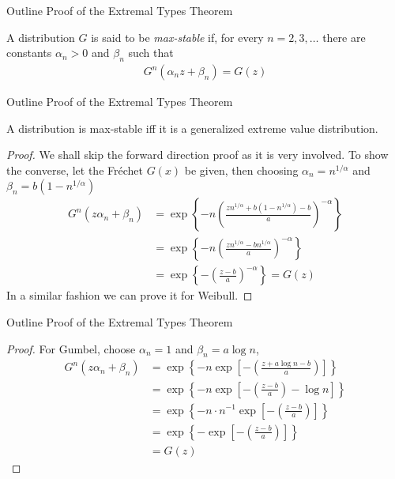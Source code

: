 \documentclass[10pt]{beamer}
\begin{document}
\begin{frame}{Outline Proof of the Extremal Types Theorem}
\begin{definition}
A distribution $G$ is said to be \emph{max-stable} if, for every $n=2,3,\ldots$ there are constants $\alpha_n>0$ and $\beta_n$ such that
\begin{align*}
G^n(\alpha_nz+\beta_n) = G(z)
\end{align*}
\end{definition}
\end{frame}

\begin{frame}{Outline Proof of the Extremal Types Theorem}
\begin{theorem}\label{thm:maxstablegev}
A distribution is max-stable iff it is a generalized extreme value distribution.
\begin{proof}
We shall skip the forward direction proof as it is very involved. To show the converse, let the Fr\'echet $G(x)$ be given, then choosing $\alpha_n = n^{1/\alpha}$ and $\beta_n = b(1-n^{1/\alpha})$
\begin{align*}
G^n(z\alpha_n+\beta_n) &= \exp\left\{-n\left(\frac{zn^{1/\alpha}+b(1-n^{1/\alpha})-b}{a}\right)^{-\alpha}\right\}\\
&= \exp\left\{-n\left(\frac{zn^{1/\alpha}-bn^{1/\alpha}}{a}\right)^{-\alpha}\right\}\\
&= \exp\left\{-\left(\frac{z-b}{a}\right)^{-\alpha}\right\}=G(z)
\end{align*}
In a similar fashion we can prove it for Weibull. 
\end{proof}
\end{theorem}
\end{frame}

\begin{frame}{Outline Proof of the Extremal Types Theorem}
\begin{proof}
For Gumbel, choose $\alpha_n = 1$ and $\beta_n = a\log n$, 
\begin{align*}
G^n(z\alpha_n+\beta_n) &= \exp\left\{-n\exp\left[-\left(\frac{z+a\log n-b}{a}\right)\right]\right\} \\
&= \exp\left\{-n\exp\left[-\left(\frac{z-b}{a}\right)-\log n\right]\right\} \\
&= \exp\left\{-n\cdot n^{-1}\exp\left[-\left(\frac{z-b}{a}\right)\right]\right\}\\
&= \exp\left\{-\exp\left[-\left(\frac{z-b}{a}\right)\right]\right\} \\
&=G(z)
\end{align*}
\end{proof}
\end{frame}
\end{document}
